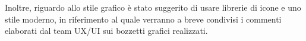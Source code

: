 \documentclass[10pt, letterpaper]{article}
\begin{document}
Inoltre, riguardo allo stile grafico è stato suggerito di usare librerie di icone e uno stile moderno, in riferimento al quale verranno a breve 
condivisi i commenti elaborati dal team UX/UI sui bozzetti grafici realizzati.




\makeDecisionTable


\makeTodoTable
\end{document}
